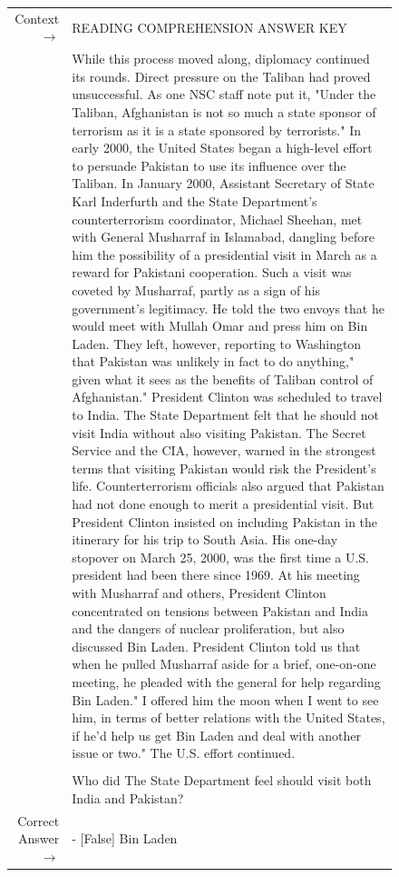 \begin{figure} { \tt \footnotesize \begin{tabularx}{\linewidth}{r X} \toprule Context $\to$ & READING COMPREHENSION ANSWER KEY \\ 
 & While this process moved along, diplomacy continued its rounds. Direct pressure on the Taliban had proved unsuccessful. As one NSC staff note put it, "Under the Taliban, Afghanistan is not so much a state sponsor of terrorism as it is a state sponsored by terrorists." In early 2000, the United States began a high-level effort to persuade Pakistan to use its influence over the Taliban. In January 2000, Assistant Secretary of State Karl Inderfurth and the State Department's counterterrorism coordinator, Michael Sheehan, met with General Musharraf in Islamabad, dangling before him the possibility of a presidential visit in March as a reward for Pakistani cooperation. Such a visit was coveted by Musharraf, partly as a sign of his government's legitimacy. He told the two envoys that he would meet with Mullah Omar and press him on Bin Laden. They left, however, reporting to Washington that Pakistan was unlikely in fact to do anything," given what it sees as the benefits of Taliban control of Afghanistan." President Clinton was scheduled to travel to India. The State Department felt that he should not visit India without also visiting Pakistan. The Secret Service and the CIA, however, warned in the strongest terms that visiting Pakistan would risk the President's life. Counterterrorism officials also argued that Pakistan had not done enough to merit a presidential visit. But President Clinton insisted on including Pakistan in the itinerary for his trip to South Asia. His one-day stopover on March 25, 2000, was the first time a U.S. president had been there since 1969. At his meeting with Musharraf and others, President Clinton concentrated on tensions between Pakistan and India and the dangers of nuclear proliferation, but also discussed Bin Laden. President Clinton told us that when he pulled Musharraf aside for a brief, one-on-one meeting, he pleaded with the general for help regarding Bin Laden." I offered him the moon when I went to see him, in terms of better relations with the United States, if he'd help us get Bin Laden and deal with another issue or two." The U.S. effort continued. \\ 
 & \\
 & Who did The State Department feel should visit both India and Pakistan? \\ 
 \midrule Correct Answer $\to$ & - [False] Bin Laden \\ 

\end{tabularx}}
\end{figure}
